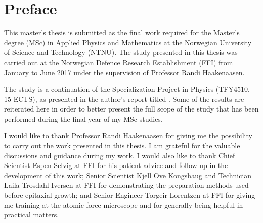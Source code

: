 \chapter*{Preface}%
%
This master's thesis is submitted as the final work required for the Master's degree (MSc) in Applied Physics and Mathematics at the Norwegian University of Science and Technology (NTNU). The study presented in this thesis was carried out at the Norwegian Defence Research Establishment (FFI) from January to June 2017 under the supervision of Professor Randi Haakenaasen. 

The study is a continuation of the Specialization Project in Physics (TFY4510, 15 ECTS), as presented in the author's report titled  \citep{lauten2017characterisation}. Some of the results are reiterated here in order to better present the full scope of the study that has been performed during the final year of my MSc studies. %

%
I would like to thank Professor Randi Haakenaasen for giving me the possibility to carry out the work presented in this thesis. I am grateful for the valuable discussions and guidance during my work. I would also like to thank Chief Scientist Espen Selvig at FFI for his patient advice and follow up in the development of this work; Senior Scientist Kjell Ove Kongshaug and Technician Laila Trosdahl-Iversen at FFI for demonstrating the preparation methods used before epitaxial growth; and Senior Engineer Torgeir Lorentzen at FFI for giving me training at the atomic force microscope and for generally being helpful in practical matters.
%

